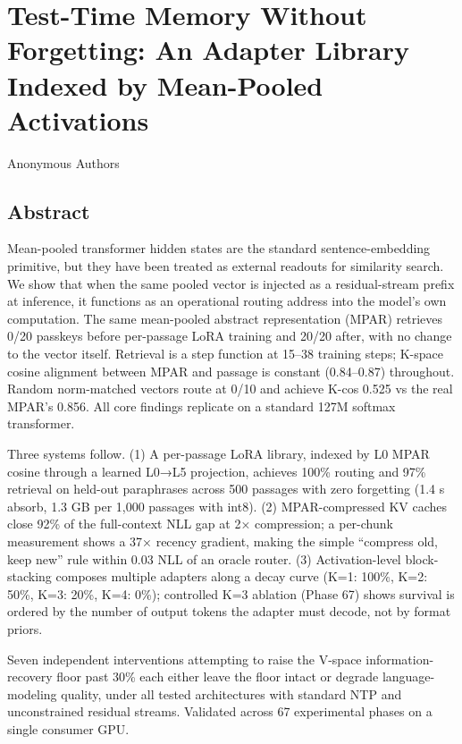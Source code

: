 \section{Test-Time Memory Without Forgetting: An Adapter Library Indexed by Mean-Pooled Activations}\label{test-time-memory-without-forgetting-an-adapter-library-indexed-by-mean-pooled-activations}

Anonymous Authors

\subsection{Abstract}\label{abstract}

Mean-pooled transformer hidden states are the standard sentence-embedding primitive, but they have been treated as external readouts for similarity search. We show that when the same pooled vector is injected as a residual-stream prefix at inference, it functions as an operational routing address into the model's own computation. The same mean-pooled abstract representation (MPAR) retrieves 0/20 passkeys before per-passage LoRA training and 20/20 after, with no change to the vector itself. Retrieval is a step function at 15--38 training steps; K-space cosine alignment between MPAR and passage is constant (0.84--0.87) throughout. Random norm-matched vectors route at 0/10 and achieve K-cos 0.525 vs the real MPAR's 0.856. All core findings replicate on a standard 127M softmax transformer.

Three systems follow. (1) A per-passage LoRA library, indexed by L0 MPAR cosine through a learned L0→L5 projection, achieves 100\% routing and 97\% retrieval on held-out paraphrases across 500 passages with zero forgetting (1.4 s absorb, 1.3 GB per 1,000 passages with int8). (2) MPAR-compressed KV caches close 92\% of the full-context NLL gap at 2× compression; a per-chunk measurement shows a 37× recency gradient, making the simple ``compress old, keep new'' rule within 0.03 NLL of an oracle router. (3) Activation-level block-stacking composes multiple adapters along a decay curve (K=1: 100\%, K=2: 50\%, K=3: 20\%, K=4: 0\%); controlled K=3 ablation (Phase 67) shows survival is ordered by the number of output tokens the adapter must decode, not by format priors.

Seven independent interventions attempting to raise the V-space information-recovery floor past 30\% each either leave the floor intact or degrade language-modeling quality, under all tested architectures with standard NTP and unconstrained residual streams. Validated across 67 experimental phases on a single consumer GPU.

